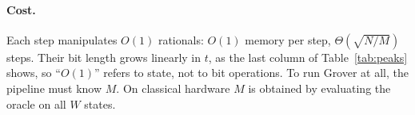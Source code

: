 \documentclass[11pt]{article}
\theoremstyle{definition}
\begin{document}
\begin{table}[h]\centering\small
{}
\caption{Exact peaks. Decimals are truncations of the exact Fractions. The $\lfloor\sqrt{N/M}\rfloor+2$ step bound
never binds for $N=2^D$, $D\le24$, $M\in\{1,2,3,5\}$. For $N<64$ the full $2^D$ Fraction vector is stepped alongside
the two-amplitude state and matches it exactly.}\label{tab:peaks}
\end{table}

\paragraph{Cost.} Each step manipulates $O(1)$ rationals: $O(1)$ memory per step, $\Theta(\sqrt{N/M})$ steps. Their bit length grows linearly in $t$, as the last column
of Table~\ref{tab:peaks} shows, so ``$O(1)$'' refers to state, not to bit operations. To run Grover at all, the
pipeline must know $M$. On classical hardware $M$ is obtained by evaluating the oracle on all $W$ states.
\end{document}
